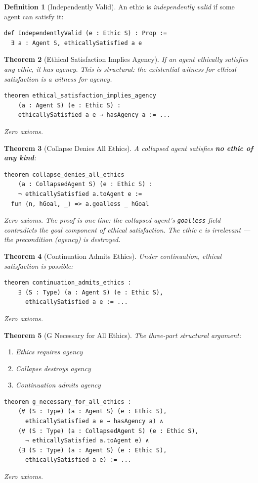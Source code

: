 \documentclass[11pt,a4paper]{article}
\newtheorem{theorem}{Theorem}[section]
\theoremstyle{definition}
\newtheorem{definition}[theorem]{Definition}
\theoremstyle{remark}
\begin{document}
\begin{definition}[Independently Valid]
An ethic is \emph{independently valid} if some agent can satisfy it:
\begin{lstlisting}
def IndependentlyValid (e : Ethic S) : Prop :=
  ∃ a : Agent S, ethicallySatisfied a e
\end{lstlisting}
\end{definition}

\begin{theorem}[Ethical Satisfaction Implies Agency]
If an agent ethically satisfies any ethic, it has agency. This is structural: the existential witness for ethical satisfaction is a witness for agency.
\begin{lstlisting}
theorem ethical_satisfaction_implies_agency
    (a : Agent S) (e : Ethic S) :
    ethicallySatisfied a e → hasAgency a := ...
\end{lstlisting}
Zero axioms.
\end{theorem}

\begin{theorem}[Collapse Denies All Ethics]
\label{thm:collapse-denies-all}
A collapsed agent satisfies \textbf{no ethic of any kind}:
\begin{lstlisting}
theorem collapse_denies_all_ethics
    (a : CollapsedAgent S) (e : Ethic S) :
    ¬ ethicallySatisfied a.toAgent e :=
  fun ⟨n, hGoal, _⟩ => a.goalless _ hGoal
\end{lstlisting}
Zero axioms. The proof is one line: the collapsed agent's \texttt{goalless} field contradicts the goal component of ethical satisfaction. The ethic $e$ is irrelevant --- the precondition (agency) is destroyed.
\end{theorem}

\begin{theorem}[Continuation Admits Ethics]
Under continuation, ethical satisfaction is possible:
\begin{lstlisting}
theorem continuation_admits_ethics :
    ∃ (S : Type) (a : Agent S) (e : Ethic S),
      ethicallySatisfied a e := ...
\end{lstlisting}
Zero axioms.
\end{theorem}

\begin{theorem}[G Necessary for All Ethics]
\label{thm:g-necessary-all-ethics}
The three-part structural argument:
\begin{enumerate}[nosep]
\item Ethics requires agency
\item Collapse destroys agency
\item Continuation admits agency
\end{enumerate}
\begin{lstlisting}
theorem g_necessary_for_all_ethics :
    (∀ (S : Type) (a : Agent S) (e : Ethic S),
      ethicallySatisfied a e → hasAgency a) ∧
    (∀ (S : Type) (a : CollapsedAgent S) (e : Ethic S),
      ¬ ethicallySatisfied a.toAgent e) ∧
    (∃ (S : Type) (a : Agent S) (e : Ethic S),
      ethicallySatisfied a e) := ...
\end{lstlisting}
Zero axioms.
\end{theorem}
\end{document}
